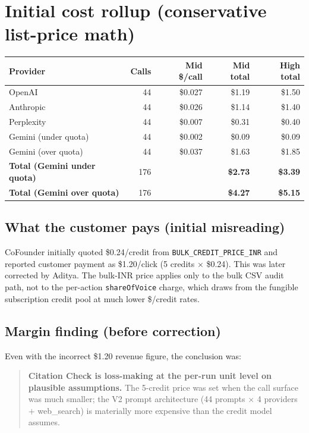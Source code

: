 \documentclass[11pt,letterpaper]{article}
\begin{document}
\section{Initial cost rollup (conservative list-price math)}

\begin{center}
\begin{tabular}{@{}lrrrr@{}}
\toprule
\textbf{Provider} & \textbf{Calls} & \textbf{Mid \$/call} & \textbf{Mid total} & \textbf{High total} \\
\midrule
OpenAI               & 44 & \$0.027 & \$1.19 & \$1.50 \\
Anthropic            & 44 & \$0.026 & \$1.14 & \$1.40 \\
Perplexity           & 44 & \$0.007 & \$0.31 & \$0.40 \\
Gemini (under quota) & 44 & \$0.002 & \$0.09 & \$0.09 \\
Gemini (over quota)  & 44 & \$0.037 & \$1.63 & \$1.85 \\
\midrule
\textbf{Total (Gemini under quota)} & 176 & & \textbf{\$2.73} & \textbf{\$3.39} \\
\textbf{Total (Gemini over quota)}  & 176 & & \textbf{\$4.27} & \textbf{\$5.15} \\
\bottomrule
\end{tabular}
\end{center}

\subsection{What the customer pays (initial misreading)}

CoFounder initially quoted \$0.24/credit from \texttt{BULK\_CREDIT\_PRICE\_INR}
and reported customer payment as \$1.20/click (5 credits $\times$ \$0.24).
This was later corrected by Aditya. The bulk-INR price applies only to the
bulk CSV audit path, not to the per-action \texttt{shareOfVoice} charge,
which draws from the fungible subscription credit pool at much lower \$/credit
rates.

\subsection{Margin finding (before correction)}

Even with the incorrect \$1.20 revenue figure, the conclusion was:

\begin{quote}
\textbf{Citation Check is loss-making at the per-run unit level on plausible
assumptions.} The 5-credit price was set when the call surface was much
smaller; the V2 prompt architecture (44 prompts $\times$ 4 providers
$+$ web\_search) is materially more expensive than the credit model assumes.
\end{quote}
\end{document}
